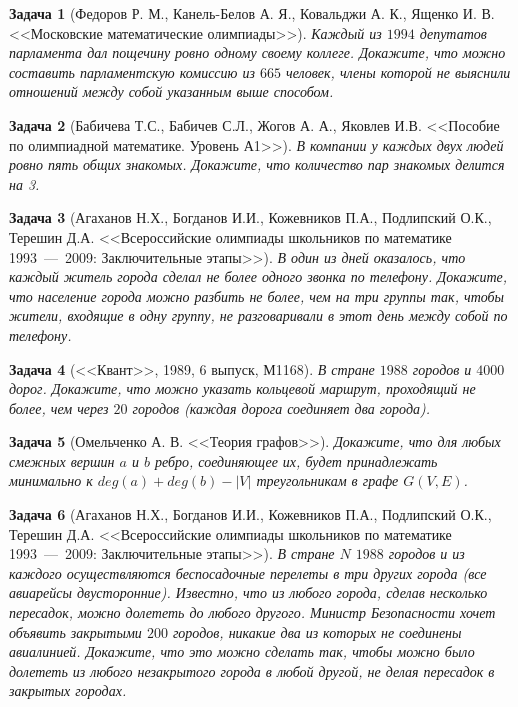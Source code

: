 \documentclass[12pt,a4paper,fleqn]{article}
\newtheorem{exersize}{Задача}
\begin{document}
\begin{exersize}[Федоров Р. М., Канель-Белов А. Я., Ковальджи А. К., Ященко И. В. <<Московские математические олимпиады>>]
	Каждый из $1994$ депутатов парламента дал пощечину ровно одному своему коллеге. Докажите, что можно составить парламентскую комиссию из $665$ человек, члены которой не выяснили отношений между собой указанным выше способом.
\end{exersize}	

\begin{exersize}[Бабичева Т.С., Бабичев С.Л., Жогов А. А., Яковлев И.В. <<Пособие по олимпиадной математике. Уровень А1>>]
	В компании у каждых двух людей ровно пять общих знакомых. Докажите, что количество пар знакомых делится на 3.
\end{exersize}

\begin{exersize}[Агаханов Н.Х., Богданов И.И., Кожевников П.А., Подлипский О.К., Терешин Д.А. <<Всероссийские олимпиады школьников по математике 1993~---~2009: Заключительные этапы>>]
	В один из дней оказалось, что каждый житель города сделал не более одного звонка по телефону. 
	Докажите, что население города можно разбить не более, чем на три группы так, чтобы жители, входящие в одну группу, 
	не разговаривали в этот день между собой по телефону.
\end{exersize}	 

\begin{exersize}[<<Квант>>, 1989, 6 выпуск, М1168]
	В стране $1988$ городов и $4000$ дорог. Докажите, что можно указать кольцевой маршрут, проходящий не более, 
	чем через $20$ городов (каждая дорога соединяет два города).
\end{exersize}

\begin{exersize}[Омельченко А. В. <<Теория графов>>]
	Докажите, что для любых смежных вершин $a$ и $b$ ребро, соединяющее их, будет принадлежать минимально к 
	$deg (a) + deg (b) - |V|$ треугольникам в графе $G(V, E)$.
\end{exersize}

\begin{exersize}[Агаханов Н.Х., Богданов И.И., Кожевников П.А., Подлипский О.К., Терешин Д.А. <<Всероссийские олимпиады школьников по математике 1993~---~2009: Заключительные этапы>>]
	В стране $N$ $1988$ городов и из каждого осуществляются беспосадочные перелеты в три других города (все авиарейсы двусторонние). Известно, что из любого города, сделав несколько пересадок, можно долететь до любого другого. Министр Безопасности хочет объявить закрытыми $200$ городов, никакие два из которых не соединены авиалинией. Докажите, что это можно сделать так, чтобы можно было долететь из любого незакрытого города в любой другой, не делая пересадок в закрытых городах.
\end{exersize}	 
\end{document}
